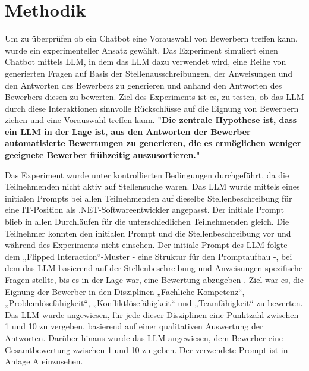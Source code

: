 
\chapter{Methodik}

Um zu überprüfen ob ein Chatbot eine Vorauswahl von Bewerbern treffen kann, wurde ein experimenteller Ansatz gewählt. 
Das Experiment simuliert einen Chatbot mittels \acs{LLM}, in dem das \acs{LLM} dazu verwendet wird, 
eine Reihe von generierten Fragen auf Basis der Stellenausschreibungen,
der Anweisungen und den Antworten des Bewerbers zu generieren und anhand den Antworten des Bewerbers 
diesen zu bewerten. Ziel des Experiments ist es, zu testen, ob das \acs{LLM} durch diese Interaktionen 
sinnvolle Rückschlüsse auf die Eignung von Bewerbern ziehen und eine Vorauswahl treffen kann. 
\textbf{"Die zentrale Hypothese ist, dass ein \acs{LLM} in der Lage ist, aus den Antworten der Bewerber automatisierte Bewertungen zu generieren, die es ermöglichen weniger geeignete 
Bewerber frühzeitig auszusortieren."} 


Das Experiment wurde unter kontrollierten Bedingungen durchgeführt, da die Teilnehmenden nicht aktiv auf Stellensuche waren. 
Das \acs{LLM} wurde mittels eines initialen Prompts bei allen Teilnehmenden auf dieselbe Stellenbeschreibung 
für eine IT-Position als .NET-Softwareentwickler angepasst. Der initiale Prompt blieb in allen 
Durchläufen für die unterschiedlichen Teilnehmenden gleich. Die Teilnehmer konnten den initialen Prompt und die Stellenbeschreibung vor und während 
des Experiments nicht einsehen. 
Der initiale Prompt des \acs{LLM} folgte dem „Flipped Interaction“-Muster - eine Struktur für den Promptaufbau -, bei dem das \acs{LLM} basierend 
auf der Stellenbeschreibung und Anweisungen spezifische Fragen stellte, bis es in der Lage war, 
eine Bewertung abzugeben \cite{white:2023}. Ziel war es, die Eignung der Bewerber in den Disziplinen 
„Fachliche Kompetenz“, „Problemlösefähigkeit“, „Konfliktlösefähigkeit“ und „Teamfähigkeit“ zu 
bewerten. Das \acs{LLM} wurde angewiesen, für jede dieser Disziplinen eine Punktzahl zwischen 1 und 10 
zu vergeben, basierend auf einer qualitativen Auswertung der Antworten. Darüber hinaus wurde das \acs{LLM} 
angewiesen, dem Bewerber eine Gesamtbewertung zwischen 1 und 10 zu geben. Der verwendete Prompt 
ist in Anlage A einzusehen. 


